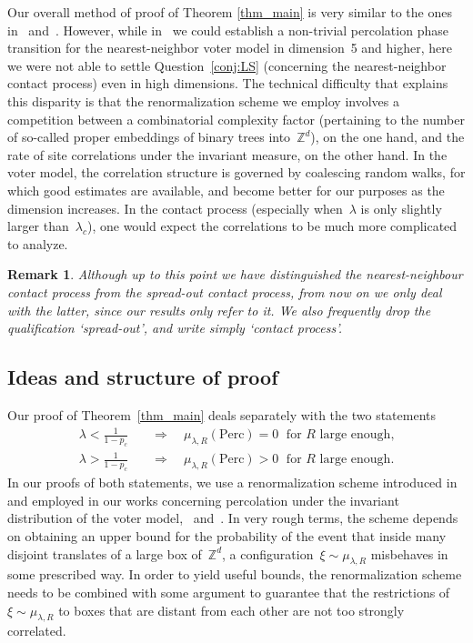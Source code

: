 \documentclass[a4paper,12pt]{article}
\newtheorem  {remark}        [theorem]{Remark}
\newcommand{\Z}{\mathbb{Z}}
\begin{document}
Our overall method of proof of Theorem \ref{thm_main} is very similar to the ones in~\cite{RV15} and~\cite{RV17}. However, while in~\cite{RV15} we could establish a non-trivial percolation phase transition for the nearest-neighbor voter model in dimension~5 and higher, here we were not able to settle Question~\ref{conj:LS} (concerning the nearest-neighbor contact process) even in high dimensions. The technical difficulty that explains this disparity is that the renormalization scheme we employ involves a competition between a combinatorial complexity factor (pertaining to the number of so-called proper embeddings of binary trees into~$\Z^d$), on the one hand, and the rate of site correlations under the invariant measure, on the other hand. In the voter model, the correlation structure is governed by coalescing random walks, for which good estimates are available, and become better for our purposes as the dimension increases. In the contact process (especially when~$\lambda$ is only slightly larger than~$\lambda_c$), one would expect the correlations to be much more complicated to analyze.


\begin{remark}
	Although up to this point we have distinguished the nearest-neighbour contact process from the spread-out contact process, from now on we only deal with the latter, since our results only refer to it. We also frequently drop the qualification `spread-out', and write simply `contact process'.
	\end{remark}

\subsection{Ideas and structure of proof}
Our proof of Theorem~\ref{thm_main} deals separately with the two statements
\begin{align}
\label{eq:want_main1}
	\lambda < \frac{1}{1-p_c} \quad &\Longrightarrow \quad \mu_{\lambda, R}(\mathrm{Perc}) = 0 \; \text{ for $R$ large enough,}\\
\label{eq:want_main2}
	\lambda >  \frac{1}{1-p_c} \quad &\Longrightarrow \quad \mu_{\lambda, R}(\mathrm{Perc}) > 0 \; \text{ for $R$ large enough.}
\end{align}
In our proofs of both statements, we use a renormalization scheme introduced in~\cite{Ra15} and employed in our works concerning percolation under the invariant distribution of the voter model,~\cite{RV15} and~\cite{RV17}. In very rough terms, the scheme depends on obtaining an upper bound for the probability of the event that inside many disjoint translates of a large box of~$\Z^d$, a configuration~$\xi \sim \mu_{\lambda,R}$ misbehaves in some prescribed way. In order to yield useful bounds, the renormalization scheme needs to be combined with some argument to guarantee that the restrictions of~$\xi \sim \mu_{\lambda,R}$ to boxes that are distant from each other are not too strongly correlated.
\end{document}
